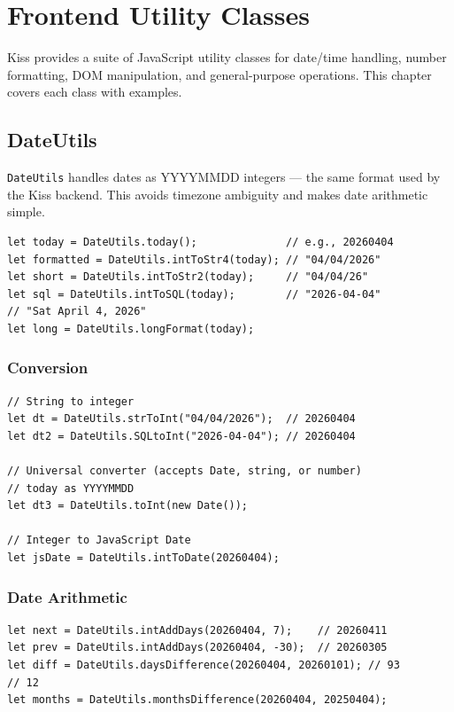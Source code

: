 \chapter{Frontend Utility Classes}
\label{ch:fe-utilities}

Kiss provides a suite of JavaScript utility classes for date/time handling, number formatting, DOM manipulation, and general-purpose operations.  This chapter covers each class with examples.

\section{DateUtils}
\label{sec:feu-dateutils}

\texttt{DateUtils} handles dates as YYYYMMDD integers --- the same format used by the Kiss backend.  This avoids timezone ambiguity and makes date arithmetic simple.

\begin{lstlisting}[style=javascript]
let today = DateUtils.today();              // e.g., 20260404
let formatted = DateUtils.intToStr4(today); // "04/04/2026"
let short = DateUtils.intToStr2(today);     // "04/04/26"
let sql = DateUtils.intToSQL(today);        // "2026-04-04"
// "Sat April 4, 2026"
let long = DateUtils.longFormat(today);
\end{lstlisting}

\subsection{Conversion}

\begin{lstlisting}[style=javascript]
// String to integer
let dt = DateUtils.strToInt("04/04/2026");  // 20260404
let dt2 = DateUtils.SQLtoInt("2026-04-04"); // 20260404

// Universal converter (accepts Date, string, or number)
// today as YYYYMMDD
let dt3 = DateUtils.toInt(new Date());

// Integer to JavaScript Date
let jsDate = DateUtils.intToDate(20260404);
\end{lstlisting}

\subsection{Date Arithmetic}

\begin{lstlisting}[style=javascript]
let next = DateUtils.intAddDays(20260404, 7);    // 20260411
let prev = DateUtils.intAddDays(20260404, -30);  // 20260305
let diff = DateUtils.daysDifference(20260404, 20260101); // 93
// 12
let months = DateUtils.monthsDifference(20260404, 20250404);
\end{lstlisting}

